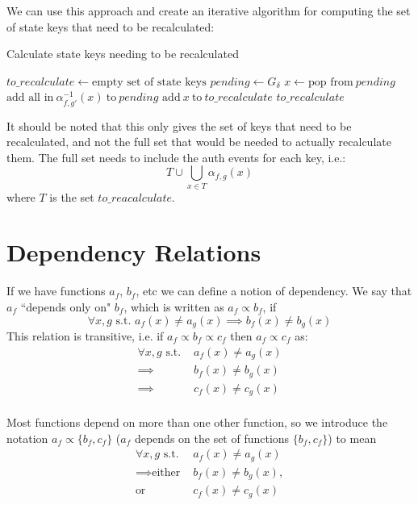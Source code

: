 \documentclass{article}
\begin{document}
\begin{minipage}{\textwidth}

We can use this approach and create an iterative algorithm for computing the set of state keys that need to be recalculated:

\begin{algorithm}[H]
\caption{Calculate state keys needing to be recalculated}
\begin{algorithmic}
	\STATE $to\_recalculate \leftarrow \text{empty set of state keys}$
	\STATE $pending \leftarrow G_\delta$
		\STATE $x \leftarrow \text{pop from}\ pending$
			\STATE $\text{add all in}\ \alpha_{f,g'}^{-1}(x)\ \text{to}\ pending$
			\STATE $\text{add}\ x\ \text{to}\ to\_recalculate$
		\ENDIF
	\ENDWHILE
	\RETURN $to\_recalculate$
\end{algorithmic}
\end{algorithm}

\end{minipage}

It should be noted that this only gives the set of keys that need to be recalculated, and not the full set that would be needed to actually recalculate them. The full set needs to include the auth events for each key, i.e.:
\[
T \cup \bigcup_{x \in T} \alpha_{f,g}(x)
\]
where $T$ is the set $to\_reacalculate$.

\clearpage
\appendix
\appendixpage
\addappheadtotoc
\section{Dependency Relations}

If we have functions $a_f$, $b_f$, etc we can define a notion of dependency. We say that $a_f$ ``depends only on" $b_f$, which is written as $a_f \propto b_f$, if
\[
	\forall x, g \text{ s.t. } a_f(x) \neq a_g(x) \implies b_f(x) \neq b_g(x)
\]
This relation is transitive, i.e. if $a_f \propto b_f \propto c_f$ then $a_f \propto c_f$ as:
\[
\begin{split}
	\forall x, g \text{ s.t. } & a_f(x) \neq a_g(x)\\
	\implies & b_f(x) \neq b_g(x)\\
	\implies & c_f(x) \neq c_g(x)\\
\end{split}
\]

Most functions depend on more than one other function, so we introduce the notation $a_f \propto \{b_f, c_f\}$ ($a_f$ depends on the set of functions $\{b_f, c_f\}$) to mean
\[
\begin{split}
	\forall x, g \text{ s.t. }& a_f(x) \neq a_g(x)\\
	\implies \text{either }& b_f(x) \neq b_g(x),\\
	\text{or }& c_f(x) \neq c_g(x)\\
\end{split}
\]
\end{document}
